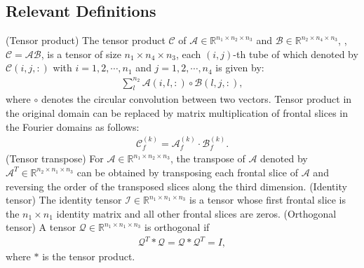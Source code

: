 \documentclass[10pt,twocolumn,letterpaper]{article}
\begin{document}
\subsection{Relevant Definitions}
{ (Tensor product) The tensor product $\mathcal{C}$ of $\mathcal{A}\in \mathbb{R}^{n_1\times n_2\times n_3}$ and $\mathcal{B}\in \mathbb{R}^{n_2\times n_4\times n_3}$, \ie, $\mathcal{C}=\mathcal{A}\mathcal{B}$, is a tensor of size $n_1\times n_4\times n_3$, each $(i,j)$-th tube of which denoted by $\mathcal{C}(i,j,:)$ with $i=1,2,\cdots,n_1$ and $j=1,2,\cdots,n_4$ is given by:}
\begin{align}
	\sum_{l}^{n_2}\mathcal{A}(i,l,:)\circ \mathcal{B}(l,j,:),
\end{align}
where $\circ$ denotes the circular convolution between two vectors. Tensor product in the original domain can be replaced by matrix multiplication of frontal slices in the Fourier domains as follows:
\begin{align}
	\mathcal{C}_f^{(k)} = \mathcal{A}_f^{(k)}\cdot\mathcal{B}_f^{(k)}.
\end{align}
{ (Tensor transpose) For $\mathcal{A}\in \mathbb{R}^{n_1\times n_2\times n_3}$, the transpose of $\mathcal{A}$ denoted by $\mathcal{A}^T\in \mathbb{R}^{n_2\times n_1\times n_3}$ can be obtained by transposing each frontal slice of $\mathcal{A}$ and reversing the order of the transposed slices along the third dimension.}
{ (Identity tensor) The identity tensor $\mathcal{I}\in \mathbb{R}^{n_1\times n_1\times n_3}$ is a tensor whose first frontal slice is the $n_1 \times n_1$ identity matrix and all other frontal slices are zeros.}
{ (Orthogonal tensor) A tensor $\mathcal{Q} \in \mathbb{R}^{n_1\times n_1\times n_3}$ is orthogonal if 
\begin{align}
	\mathcal{Q}^T*\mathcal{Q}=\mathcal{Q}*\mathcal{Q}^T=I,
\end{align}
where $*$ is the tensor product.}
\end{document}
